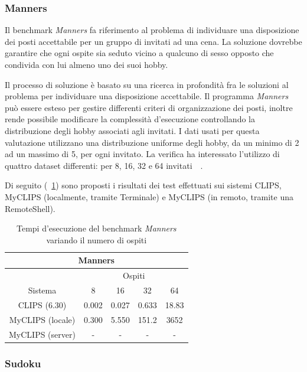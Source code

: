 \subsubsection{Manners}

Il benchmark \emph{Manners} fa riferimento al problema di individuare una disposizione dei posti accettabile per un gruppo di invitati ad una cena. La soluzione dovrebbe garantire che ogni ospite sia seduto vicino a qualcuno di sesso opposto che condivida con lui almeno uno dei suoi hobby.

Il processo di soluzione è basato su una ricerca in profondità fra le soluzioni al problema per individuare una disposizione accettabile. Il programma \emph{Manners} può essere esteso per gestire differenti criteri di organizzazione dei posti, inoltre rende possibile modificare la complessità d'esecuzione controllando la distribuzione degli hobby associati agli invitati. I dati usati per questa valutazione utilizzano una distribuzione uniforme degli hobby, da un minimo di 2 ad un massimo di 5, per ogni invitato. 
La verifica ha interessato l'utilizzo di quattro dataset differenti: per 8, 16, 32 e 64 invitati~\cite{kiernan:inria-00075406}~\cite{brantetal91}. 

Di seguito (\tablename~\ref{tab:bench-manners}) sono proposti i risultati dei test effettuati sui sistemi CLIPS, MyCLIPS (localmente, tramite Terminale) e MyCLIPS (in remoto, tramite una RemoteShell).

\begin{table}[h]
\caption{Tempi d'esecuzione del benchmark \emph{Manners} variando il numero di ospiti}\label{tab:bench-manners}
\centering
\begin{tabular}{|c||c|c|c|c|}
\hline 
\multicolumn{5}{|c|}{Manners} \\ 
\hline 
 & \multicolumn{4}{c|}{Ospiti} \\ 
\hline 
Sistema & 8 & 16 & 32 & 64 \\ 
\hline\hline
CLIPS (6.30) & 0.002 & 0.027 & 0.633 & 18.83 \\ 
\hline 
MyCLIPS (locale) & 0.300 & 5.550 & 151.2 & 3652 \\ 
\hline 
MyCLIPS (server) & - & - & - & - \\ 
\hline 
\end{tabular} 
\end{table}

\subsubsection{Sudoku}

